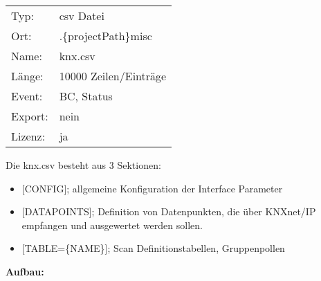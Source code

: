 \documentclass[letterpaper,10pt,english]{sphinxmanual}
\begin{document}
\begin{tabulary}{\linewidth}{|L|L|}
\hline

Typ:
 & 
csv Datei
\\

Ort:
 & 
.\{projectPath\}misc
\\

Name:
 & 
knx.csv
\\

Länge:
 & 
10000 Zeilen/Einträge
\\

Event:
 & 
BC, Status
\\

Export:
 & 
nein
\\

Lizenz:
 & 
ja
\\
\hline\end{tabulary}


\begin{DUlineblock}{0em}
\item[] Die knx.csv besteht aus 3 Sektionen:
\end{DUlineblock}
\begin{itemize}
\item {} 
{[}CONFIG{]};                     allgemeine Konfiguration der Interface Parameter

\item {} 
{[}DATAPOINTS{]};         Definition von Datenpunkten, die über KNXnet/IP empfangen und ausgewertet werden sollen.

\item {} 
{[}TABLE=\{NAME\}{]};       Scan Definitionstabellen, Gruppenpollen

\end{itemize}

\begin{DUlineblock}{0em}
\item[] 
\end{DUlineblock}

\textbf{Aufbau:}
\end{document}
